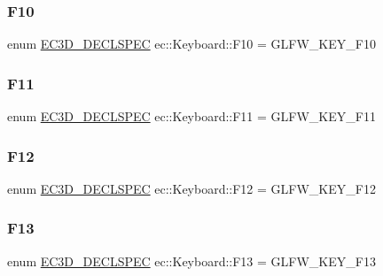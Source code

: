 \subsubsection{\texorpdfstring{F10}{F10}}
{\footnotesize\ttfamily enum \mbox{\hyperlink{_common_8h_aac42573e202ca3dd4d259c81691e2369}{E\+C3\+D\+\_\+\+D\+E\+C\+L\+S\+P\+EC}} ec\+::\+Keyboard\+::\+F10 = G\+L\+F\+W\+\_\+\+K\+E\+Y\+\_\+\+F10}

\mbox{\label{classec_1_1_keyboard_a52c268ea148aa4b22142873360c91fc2}} 
\subsubsection{\texorpdfstring{F11}{F11}}
{\footnotesize\ttfamily enum \mbox{\hyperlink{_common_8h_aac42573e202ca3dd4d259c81691e2369}{E\+C3\+D\+\_\+\+D\+E\+C\+L\+S\+P\+EC}} ec\+::\+Keyboard\+::\+F11 = G\+L\+F\+W\+\_\+\+K\+E\+Y\+\_\+\+F11}

\mbox{\label{classec_1_1_keyboard_a699bc14d848736ef074a47db2f568109}} 
\subsubsection{\texorpdfstring{F12}{F12}}
{\footnotesize\ttfamily enum \mbox{\hyperlink{_common_8h_aac42573e202ca3dd4d259c81691e2369}{E\+C3\+D\+\_\+\+D\+E\+C\+L\+S\+P\+EC}} ec\+::\+Keyboard\+::\+F12 = G\+L\+F\+W\+\_\+\+K\+E\+Y\+\_\+\+F12}

\mbox{\label{classec_1_1_keyboard_a57c5cc1e503cb08d453b6fee1f2dea47}} 
\subsubsection{\texorpdfstring{F13}{F13}}
{\footnotesize\ttfamily enum \mbox{\hyperlink{_common_8h_aac42573e202ca3dd4d259c81691e2369}{E\+C3\+D\+\_\+\+D\+E\+C\+L\+S\+P\+EC}} ec\+::\+Keyboard\+::\+F13 = G\+L\+F\+W\+\_\+\+K\+E\+Y\+\_\+\+F13}

\mbox{\label{classec_1_1_keyboard_aa85c5264f6d7cc445d7b8ad9ad5b9eac}} 
